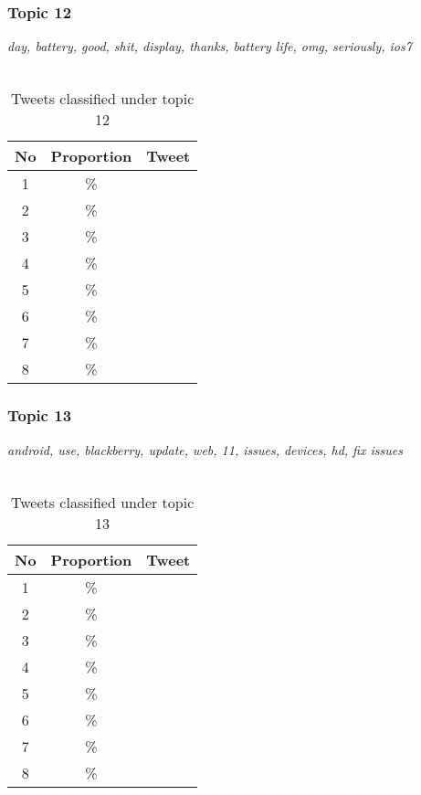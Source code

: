 \subsubsection{Topic 12}
\label{sec:topic_12}
\textit{day, battery, good, shit, display, thanks, battery life, omg, seriously, ios7}\\\\

\begin{table}[H]
  \begin{tabular}{c c p{13cm}} \toprule
    No & Proportion & Tweet \\ \midrule
    1  & \%       & \\ \midrule
    2  & \%       & \\ \midrule
    3  & \%       & \\ \midrule
    4  & \%       & \\ \midrule
    5  & \%       & \\ \midrule
    6  & \%       & \\ \midrule
    7  & \%       & \\ \midrule
    8  & \%       & \\ \bottomrule
  \end{tabular}
  \caption{Tweets classified under topic 12}
  \label{tab:tweets_under_12}
\end{table}



\subsubsection{Topic 13}
\label{sec:topic_13}
\textit{android, use, blackberry, update, web, 11, issues, devices, hd, fix issues}\\\\

\begin{table}[H]
  \begin{tabular}{c c p{13cm}} \toprule
    No & Proportion & Tweet \\ \midrule
    1  & \%       & \\ \midrule
    2  & \%       & \\ \midrule
    3  & \%       & \\ \midrule
    4  & \%       & \\ \midrule
    5  & \%       & \\ \midrule
    6  & \%       & \\ \midrule
    7  & \%       & \\ \midrule
    8  & \%       & \\ \bottomrule
  \end{tabular}
  \caption{Tweets classified under topic 13}
  \label{tab:tweets_under_13}
\end{table}



